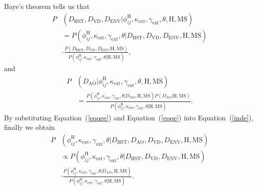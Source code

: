 \documentclass[useAMS,usenatbib]{mnras}
\newcommand{\eref}[1]{Equation~(\ref{#1})}
\begin{document}
Baye's theorem tells us that 
\begin{equation}
\label{eqqee}
\begin{split}
P&(D_{\textrm{HST}},D_{\textrm{VD}}, D_{\textrm{ENV}}|\phi_{ij}^{\textrm{H}},\kappa_{\textrm{ext}},\gamma_{\textrm{ext}},\theta,\textrm{H},\textrm{MS})\\
&=P(\phi_{ij}^{\textrm{H}},\kappa_{\textrm{ext}},\gamma_{\textrm{ext}},\theta|D_{\textrm{HST}},D_{\textrm{VD}},D_{\textrm{ENV}},\textrm{H},\textrm{MS})\\
&\cdot\frac{P(D_{\textrm{HST}},D_{\textrm{VD}},D_{\textrm{ENV}}|\textrm{H},\textrm{MS})}{P(\phi_{ij}^{\textrm{H}},\kappa_{\textrm{ext}},\gamma_{\textrm{ext}},\theta|\textrm{H},\textrm{MS})},
\end{split}
\end{equation}
and
\begin{equation}
\label{eqqe}
    \begin{split}
        P&(D_{\textrm{AO}}|\phi_{ij}^{\textrm{H}},\kappa_{\textrm{ext}},\gamma_{\textrm{ext}},\theta,\textrm{H},\textrm{MS})\\
        &=\frac{P(\phi_{ij}^{\textrm{H}},\kappa_{\textrm{ext}},\gamma_{\textrm{ext}},\theta|D_{\textrm{AO}},\textrm{H},\textrm{MS})P(D_{\textrm{AO}}|\textrm{H},\textrm{MS})}{P(\phi_{ij}^{\textrm{H}},\kappa_{\textrm{ext}},\gamma_{\textrm{ext}},\theta|\textrm{H},\textrm{MS})}.
    \end{split}
\end{equation}
By substituting \eref{eqqee} and \eref{eqqe} into \eref{inde}, finally we obtain
\begin{equation}
\label{final}
\begin{split}
P&(\phi_{ij}^{\textrm{H}},\kappa_{\textrm{ext}},\gamma_{\textrm{ext}},\theta|D_{\textrm{HST}},D_{\textrm{AO}},D_{\textrm{VD}}, D_{\textrm{ENV}},\textrm{H},\textrm{MS})\\
&\propto P(\phi_{ij}^{\textrm{H}},\kappa_{\textrm{ext}},\gamma_{\textrm{ext}},\theta|D_{\textrm{HST}},D_{\textrm{VD}}, D_{\textrm{ENV}},\textrm{H},\textrm{MS})\\
&\cdot\frac{P(\phi_{ij}^{\textrm{H}},\kappa_{\textrm{ext}},\gamma_{\textrm{ext}},\theta|D_{\textrm{AO}},\textrm{H},\textrm{MS})}{P(\phi_{ij}^{\textrm{H}},\kappa_{\textrm{ext}},\gamma_{\textrm{ext}},\theta|\textrm{H},\textrm{MS})}.
\end{split}
\end{equation}
\end{document}
